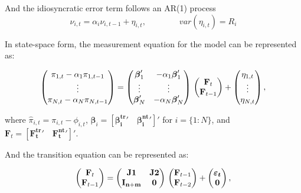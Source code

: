 \documentclass[11pt,english,a4paper]{article}
\begin{document}
And the idiosyncratic error term follows an AR(1) process
\begin{equation}\label{eq:noncore}
\nu _{i,t} = \alpha_{i}\nu_{i,t-1}+\eta_{i,t},       \qquad \qquad var(\eta_{i,t}) = R_{i}
\end{equation}

In state-space form, the measurement equation for the model can be represented as:

\begin{equation}\label{eq:ss1}
\begin{pmatrix}
\pi_{1,t}  - \alpha_{1} \pi_{1,t-1} \\
\vdots \\
\pi_{N,t}  - \alpha_{N} \pi_{N,t-1}
\end{pmatrix}
=
\begin{pmatrix}
\boldsymbol{\beta}_{1}' & - \alpha_{1}\boldsymbol{\beta}_{1}' \\
\vdots & \vdots \\
\boldsymbol{\beta}_{N}' & - \alpha_{N}\boldsymbol{\beta}_{N}' \\
\end{pmatrix}
\\
\begin{pmatrix}
\mathbf{F}_{t}\\
\mathbf{F}_{t-1}
\end{pmatrix}
+
\begin{pmatrix}
\eta_{1,t}\\
\vdots\\
\eta_{N,t}
\end{pmatrix},
\end{equation}

where $\hat{\pi}_{i,t} = \pi_{i,t}-\phi_{i,t}$, $\boldsymbol{\beta}_{i} = [\boldsymbol{\beta^{tr}_{i}}' \quad \boldsymbol{\beta^{nt}_{i}}']'$ for $i=\{1:N\}$, and $\mathbf{F}_{t} = [\mathbf{F^{tr}_{t}}' \quad \mathbf{F^{nt}_{t}}' ]'$.

And the transition equation can be represented as:


\begin{equation}\label{eq:ss2}
\begin{pmatrix}
\mathbf{F}_{t}\\
\mathbf{F}_{t-1}
\end{pmatrix}
=
\begin{pmatrix}
\mathbf{J1}      & \mathbf{J2}\\
\mathbf{I_{n+m}}   & \mathbf{0}\\
\end{pmatrix}
\\
\begin{pmatrix}
\mathbf{F}_{t-1}\\
\mathbf{F}_{t-2}
\end{pmatrix}
+
\begin{pmatrix}
\boldsymbol{\varepsilon_{t}}\\
\boldsymbol{0}
\end{pmatrix},
\end{equation}
\end{document}

